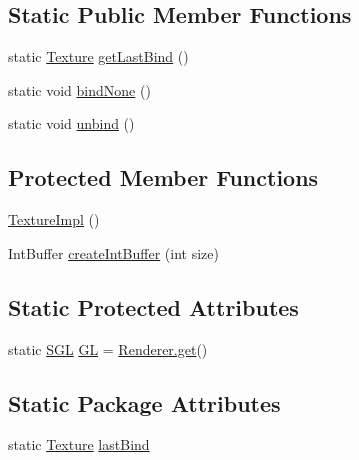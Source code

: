 \subsection*{Static Public Member Functions}
\begin{DoxyCompactItemize}
\item 
static \mbox{\hyperlink{interfaceorg_1_1newdawn_1_1slick_1_1opengl_1_1_texture}{Texture}} \mbox{\hyperlink{classorg_1_1newdawn_1_1slick_1_1opengl_1_1_texture_impl_a796a92e466d1f45d693ad4c39ebc8605}{get\+Last\+Bind}} ()
\item 
static void \mbox{\hyperlink{classorg_1_1newdawn_1_1slick_1_1opengl_1_1_texture_impl_a868110ef047125f2e6d52f503cbc827b}{bind\+None}} ()
\item 
static void \mbox{\hyperlink{classorg_1_1newdawn_1_1slick_1_1opengl_1_1_texture_impl_a824866b015116d341fb9fc0f9f0bb86f}{unbind}} ()
\end{DoxyCompactItemize}
\subsection*{Protected Member Functions}
\begin{DoxyCompactItemize}
\item 
\mbox{\hyperlink{classorg_1_1newdawn_1_1slick_1_1opengl_1_1_texture_impl_aec5b5fc2b1fb2633b6691e99a08ac43c}{Texture\+Impl}} ()
\item 
Int\+Buffer \mbox{\hyperlink{classorg_1_1newdawn_1_1slick_1_1opengl_1_1_texture_impl_af4a074ccdfc1a61d9ee75dc3430755ac}{create\+Int\+Buffer}} (int size)
\end{DoxyCompactItemize}
\subsection*{Static Protected Attributes}
\begin{DoxyCompactItemize}
\item 
static \mbox{\hyperlink{interfaceorg_1_1newdawn_1_1slick_1_1opengl_1_1renderer_1_1_s_g_l}{S\+GL}} \mbox{\hyperlink{classorg_1_1newdawn_1_1slick_1_1opengl_1_1_texture_impl_ad672b5a41ba59c882980c429c09b6572}{GL}} = \mbox{\hyperlink{classorg_1_1newdawn_1_1slick_1_1opengl_1_1renderer_1_1_renderer_abe742c3a7dfca67c6c01821d27087308}{Renderer.\+get}}()
\end{DoxyCompactItemize}
\subsection*{Static Package Attributes}
\begin{DoxyCompactItemize}
\item 
static \mbox{\hyperlink{interfaceorg_1_1newdawn_1_1slick_1_1opengl_1_1_texture}{Texture}} \mbox{\hyperlink{classorg_1_1newdawn_1_1slick_1_1opengl_1_1_texture_impl_ae726e8066199fe500031c7058f3459c3}{last\+Bind}}
\end{DoxyCompactItemize}
